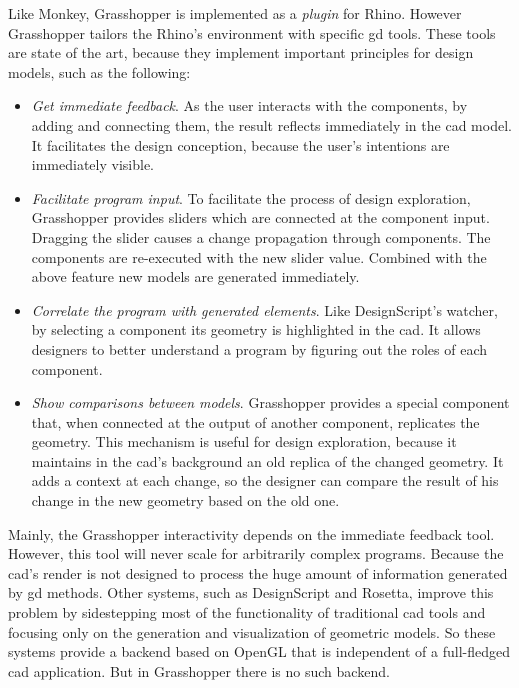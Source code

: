 Like Monkey, Grasshopper is implemented as a \textit{plugin} for Rhino\footnotemark[\ref{rhin}]. However Grasshopper tailors the Rhino's environment with specific \ac{gd} tools. These tools are state of the art, because they implement important principles for design models, such as the following:

\begin{itemize}
 \item \textit{Get immediate feedback}. As the user interacts with the components, by adding and connecting them, the result reflects immediately in the \ac{cad} model. It facilitates the design conception, because the user's intentions are immediately visible. 
 \item \textit{Facilitate program input}. To facilitate the process of design exploration, Grasshopper provides sliders which are connected at the component input. Dragging the slider causes a change propagation through components. The components are re-executed with the new slider value. Combined with the above feature new models are generated immediately.
 \item \textit{Correlate the program with generated elements}. Like DesignScript's watcher, by selecting a component its geometry is highlighted in the \ac{cad}. It allows designers to better understand a program by figuring out the roles of each component.
 \item \textit{Show comparisons between models}. Grasshopper provides a special component that, when connected at the output of another component, replicates the geometry. This mechanism is useful for design exploration, because it maintains in the \ac{cad}'s background an old replica of the changed geometry. It adds a context at each change, so the designer can compare the result of his change in the new geometry based on the old one.
\end{itemize}

Mainly, the Grasshopper interactivity depends on the immediate feedback tool. However, this tool will never scale for arbitrarily complex programs. Because the \ac{cad}'s render is not designed to process the huge amount of information generated by \ac{gd} methods. Other systems, such as DesignScript and Rosetta, improve this problem by sidestepping most of the functionality of traditional \ac{cad} tools and focusing only on the generation and visualization of geometric models. So these systems provide a backend based on OpenGL that is independent of a full-fledged \ac{cad} application. But in Grasshopper there is no such backend.

